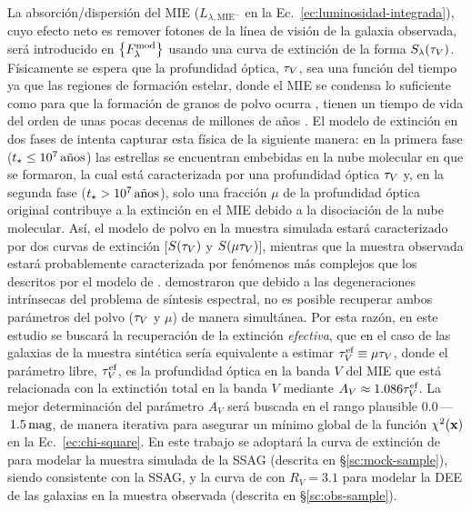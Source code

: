 La absorción/dispersión del MIE ($L_{\lambda,\text{MIE}^-}$ en la
Ec.~\ref{ec:luminosidad-integrada}), cuyo efecto neto es remover fotones de la línea de visión de la
galaxia observada, será introducido en $\set{\sedt[F]{mod}}$ usando una curva de extinción de la
forma $S_\lambda(\tauv)$. Físicamente se espera que la profundidad óptica, $\tauv$, sea una función
del tiempo ya que las regiones de formación estelar, donde el MIE se condensa lo suficiente como
para que la formación de granos de polvo ocurra \citep{Draine2009}, tienen un tiempo de vida del
orden de unas pocas decenas de millones de años \citep[véase,][para una revisión]{Lada2003}. El
modelo de extinción en dos fases de \citet{Charlot2000} intenta capturar esta física de la siguiente
manera: en la primera fase ($t_\star\leq\unit[10^7]{años}$) las estrellas se encuentran embebidas en
la nube molecular en que se formaron, la cual está caracterizada por una profundidad óptica $\tauv$
y, en la segunda fase ($t_\star>\unit[10^7]{años}$), solo una fracción $\mu$ de la profundidad
óptica original contribuye a la extinción en el MIE debido a la disociación de la nube molecular.
Así, el modelo de polvo en la muestra simulada estará caracterizado por dos curvas de extinción
[$S(\tauv)$ y $S(\mu\tauv)$], mientras que la muestra observada estará probablemente caracterizada
por fenómenos más complejos que los descritos por el modelo de \citet{Charlot2000}.
\citet{Tojeiro2007} demostraron que debido a las degeneraciones intrínsecas del problema de síntesis
espectral, no es posible recuperar ambos parámetros del polvo ($\tauv$ y $\mu$) de manera
simultánea. Por esta razón, en este estudio se buscará la recuperación de la extinción
\emph{efectiva}, que en el caso de las galaxias de la muestra sintética sería equivalente a estimar
$\tauv^\text{ef}\equiv\mu\tauv$, donde el parámetro libre, $\tauv^\text{ef}$, es la profundidad
óptica en la banda $V$ del MIE que está relacionada con la extinctión total en la banda $V$ mediante
$A_V\approx1.086\tauv^\text{ef}$. La mejor determinación del parámetro $A_V$ será buscada en el
rango plausible $0.0\,$---$\,\unit[1.5]{mag}$, de manera iterativa para asegurar un mínimo global de
la función $\chi^2(\hip)$ en la Ec.~\eqref{ec:chi-square}. En este trabajo se adoptará la curva de
extinción de \citet{Charlot2000} para modelar la muestra simulada de la SSAG (descrita en
\S\ref{sc:mock-sample}), siendo consistente con la SSAG, y la curva de \citet{Cardelli1989} con
$R_V=3.1$ para modelar la DEE de las galaxias en la muestra observada (descrita en
\S\ref{sc:obs-sample}).

